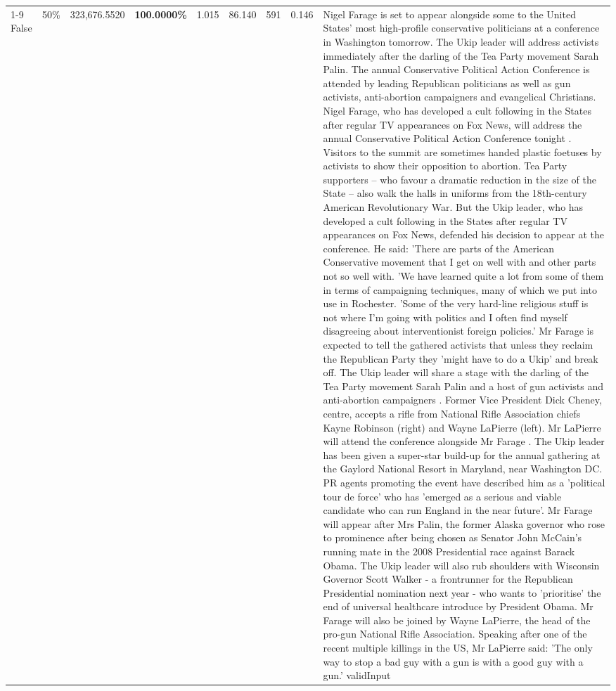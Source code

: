 \begin{table}[H]
\begin{tabular}{lllrlllll}
\cline{1-9} \cline{2-9}
False & 50\% & 323,676.5520 & \bfseries \color{red} 100.0000\% & 1.015 & 86.140 & 591 & 0.146 & Nigel Farage is set to appear alongside some to the United States' most high-profile conservative politicians at a conference in Washington tomorrow. The Ukip leader will address activists immediately after the darling of the Tea Party movement Sarah Palin. The annual Conservative Political Action Conference is attended by leading Republican politicians as well as gun activists, anti-abortion campaigners and evangelical Christians. Nigel Farage, who has developed a cult following in the States after regular TV appearances on Fox News, will address the annual Conservative Political Action Conference tonight . Visitors to the summit are sometimes handed plastic foetuses by activists to show their opposition to abortion. Tea Party supporters – who favour a dramatic reduction in the size of the State – also walk the halls in uniforms from the 18th-century American Revolutionary War. But the Ukip leader, who has developed a cult following in the States after regular TV appearances on Fox News, defended his decision to appear at the conference. He said: 'There are parts of the American Conservative movement that I get on well with and other parts not so well with. 'We have learned quite a lot from some of them in terms of campaigning techniques, many of which we put into use in Rochester. 'Some of the very hard-line religious stuff is not where I'm going with politics and I often find myself disagreeing about interventionist foreign policies.' Mr Farage is expected to tell the gathered activists that unless they reclaim the Republican Party they 'might have to do a Ukip' and break off. The Ukip leader will share a stage with the darling of the Tea Party movement Sarah Palin and a host of gun activists and anti-abortion campaigners . Former Vice President Dick Cheney, centre, accepts a rifle from National Rifle Association chiefs Kayne Robinson (right) and Wayne LaPierre (left). Mr LaPierre will attend the conference alongside Mr Farage . The Ukip leader has been given a super-star build-up for the annual gathering at the Gaylord National Resort in Maryland, near Washington DC. PR agents promoting the event have described him as a 'political tour de force' who has 'emerged as a serious and viable candidate who can run England in the near future'. Mr Farage will appear after Mrs Palin, the former Alaska governor who rose to prominence after being chosen as Senator John McCain's running mate in the 2008 Presidential race against Barack Obama. The Ukip leader will also rub shoulders with Wisconsin Governor Scott Walker - a frontrunner for the Republican Presidential nomination next year - who wants to 'prioritise' the end of universal healthcare introduce by President Obama. Mr Farage will also be joined by Wayne LaPierre, the head of the pro-gun National Rifle Association. Speaking after one of the recent multiple killings in the US, Mr LaPierre said: 'The only way to stop a bad guy with a gun is with a good guy with a gun.' validInput \\

\end{tabular}
\end{table}
